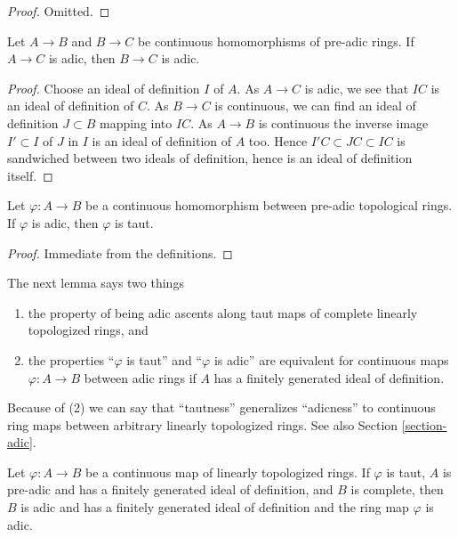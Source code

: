 \begin{proof}
Omitted.
\end{proof}

\begin{lemma}
\label{lemma-permanence-adic}
Let $A \to B$ and $B \to C$ be continuous homomorphisms of
pre-adic rings. If $A \to C$ is adic, then
$B \to C$ is adic.
\end{lemma}

\begin{proof}
Choose an ideal of definition $I$ of $A$. As $A \to C$ is adic, we
see that $IC$ is an ideal of definition of $C$.
As $B \to C$ is continuous, we can find an
ideal of definition $J \subset B$ mapping into $IC$.
As $A \to B$ is continuous the inverse image $I' \subset I$
of $J$ in $I$ is an ideal of definition of $A$ too.
Hence $I'C \subset JC \subset IC$ is sandwiched between
two ideals of definition, hence is an ideal of definition itself.
\end{proof}

\begin{lemma}
\label{lemma-adic-taut}
Let $\varphi : A \to B$ be a continuous homomorphism between
pre-adic topological rings. If $\varphi$ is adic, then $\varphi$ is taut.
\end{lemma}

\begin{proof}
Immediate from the definitions.
\end{proof}

\noindent
The next lemma says two things
\begin{enumerate}
\item the property of being adic ascents along taut maps
of complete linearly topologized rings, and
\item the properties ``$\varphi$ is taut'' and ``$\varphi$ is adic''
are equivalent for continuous maps $\varphi : A \to B$ between adic rings
if $A$ has a finitely generated ideal of definition.
\end{enumerate}
Because of (2) we can say that ``tautness'' generalizes ``adicness''
to continuous ring maps between arbitrary linearly topologized rings.
See also Section \ref{section-adic}.

\begin{lemma}
\label{lemma-taut-is-adic}
Let $\varphi : A \to B$ be a continuous map of linearly topologized rings.
If $\varphi$ is taut, $A$ is pre-adic and has a finitely generated ideal
of definition, and $B$ is complete, then $B$ is adic and has a finitely
generated ideal of definition and the ring map $\varphi$ is adic.
\end{lemma}

